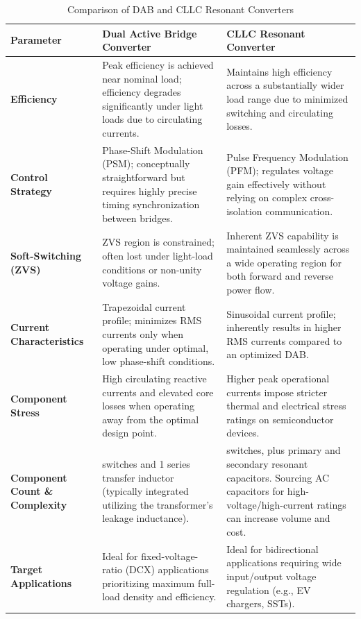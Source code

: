 \begin{table}[h!]
\centering
\caption{Comparison of DAB and CLLC Resonant Converters \cite{mukherjee2021comparison, oh2024comparison}} \label{tab:tabcomparison}
\label{tab:dab_vs_cllc}
\begin{tabular}{
    >{\raggedright\arraybackslash}p{} 
    >{\raggedright\arraybackslash}p{} 
    >{\raggedright\arraybackslash}p{}
}
\hline
\textbf{Parameter} & \textbf{Dual Active Bridge Converter \cite{krismer2012efficiency, costa2015modular, anwar2018modeling}} & \textbf{CLLC Resonant Converter \cite{ref19, xie2019analysis}} \\
\hline \hline

\textbf{Efficiency} & 
Peak efficiency is achieved near nominal load; efficiency degrades significantly under light loads due to circulating currents. & 
Maintains high efficiency across a substantially wider load range due to minimized switching and circulating losses. \\

\textbf{Control Strategy} & 
Phase-Shift Modulation (PSM); conceptually straightforward but requires highly precise timing synchronization between bridges. & 
Pulse Frequency Modulation (PFM); regulates voltage gain effectively without relying on complex cross-isolation communication. \\

\textbf{Soft-Switching (ZVS)} & 
ZVS region is constrained; often lost under light-load conditions or non-unity voltage gains. & 
Inherent ZVS capability is maintained seamlessly across a wide operating region for both forward and reverse power flow. \\

\textbf{Current Characteristics} & 
Trapezoidal current profile; minimizes RMS currents only when operating under optimal, low phase-shift conditions. & 
Sinusoidal current profile; inherently results in higher RMS currents compared to an optimized DAB. \\

\textbf{Component Stress} & 
High circulating reactive currents and elevated core losses when operating away from the optimal design point. & 
Higher peak operational currents impose stricter thermal and electrical stress ratings on semiconductor devices. \\

\textbf{Component Count \& Complexity} & 
8 switches and 1 series transfer inductor (typically integrated utilizing the transformer's leakage inductance). & 
8 switches, plus primary and secondary resonant capacitors. Sourcing AC capacitors for high-voltage/high-current ratings can increase volume and cost. \\

\textbf{Target Applications} & 
Ideal for fixed-voltage-ratio (DCX) applications prioritizing maximum full-load density and efficiency. & 
Ideal for bidirectional applications requiring wide input/output voltage regulation (e.g., EV chargers, SSTs). \\

\hline
\end{tabular}
\end{table}
\pagebreak
